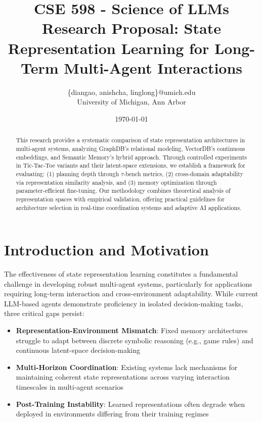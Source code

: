 \documentclass[11pt]{article}
\title{CSE 598 - Science of LLMs Research Proposal: State Representation Learning for Long-Term Multi-Agent Interactions}
\author{\{diangao, anishcha, linglong\}@umich.edu \\ University of Michigan, Ann Arbor}
\date{\today}
\begin{document}
\maketitle

\begin{abstract}
\noindent This research provides a systematic comparison of state representation architectures in multi-agent systems, analyzing GraphDB's relational modeling, VectorDB's continuous embeddings, and Semantic Memory's hybrid approach. Through controlled experiments in Tic-Tac-Toe variants and their latent-space extensions, we establish a framework for evaluating: (1) planning depth through $\tau$-bench metrics, (2) cross-domain adaptability via representation similarity analysis, and (3) memory optimization through parameter-efficient fine-tuning. Our methodology combines theoretical analysis of representation spaces with empirical validation, offering practical guidelines for architecture selection in real-time coordination systems and adaptive AI applications.
\end{abstract}

\section{Introduction and Motivation}
The effectiveness of state representation learning constitutes a fundamental challenge in developing robust multi-agent systems, particularly for applications requiring long-term interaction and cross-environment adaptability. While current LLM-based agents demonstrate proficiency in isolated decision-making tasks, three critical gaps persist:

\begin{itemize}
    \item \textbf{Representation-Environment Mismatch}: Fixed memory architectures struggle to adapt between discrete symbolic reasoning (e.g., game rules) and continuous latent-space decision-making
    
    \item \textbf{Multi-Horizon Coordination}: Existing systems lack mechanisms for maintaining coherent state representations across varying interaction timescales in multi-agent scenarios
    
    \item \textbf{Post-Training Instability}: Learned representations often degrade when deployed in environments differing from their training regimes
\end{itemize}
\end{document}

